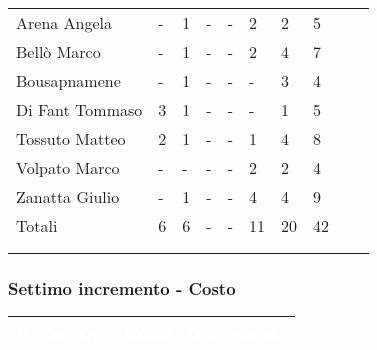 {{{\begin{longtable}{C{.3\freewidth} C{.1\freewidth} C{.1\freewidth} C{.1\freewidth} C{.1\freewidth} C{.1\freewidth} C{.1\freewidth} C{.1\freewidth} C{.1\freewidth} C{.3\freewidth}}
            Arena Angela & - & 1 & - & - & 2 & 2 & 5\\      
            Bellò Marco & - & 1 & - & - & 2 & 4 & 7\\      
            Bousapnamene & - & 1 & - & - & - & 3 & 4\\      
            Di Fant Tommaso & 3 & 1 & - & - & - & 1  & 5\\      
            Tossuto Matteo & 2 & 1 & - & - & 1 & 4  & 8 \\      
            Volpato Marco & - & - & - & - & 2 & 2 &  4 \\      
            Zanatta Giulio & - & 1 & - & - & 4 & 4 & 9 \\      
            Totali & 6 & 6 & - & - & 11 & 20 & 42\\
            \bottomrule
            \\
            \caption{}

            \end{longtable}
            }
            }
            \subsubsection{Settimo incremento - Costo} {
                \setlength{\freewidth}{\dimexpr\textwidth-30\tabcolsep}
                \renewcommand{\arraystretch}{1.0}
                \centering
                \setlength{\aboverulesep}{0pt}
                \setlength{\belowrulesep}{0pt}
                \begin{longtable}{C{.4\freewidth} C{.2\freewidth} C{.2\freewidth} C{.2\freewidth}}
                \toprule
                \textcolor{white}{\textbf{Ruolo}}&
                \textcolor{white}{\textbf{Ore}}&
                \textcolor{white}{\textbf{Costo}}&
                \textcolor{white}{\textbf{Ore previste}}\\
                \toprule
                \endhead
          

\end{longtable}}}
